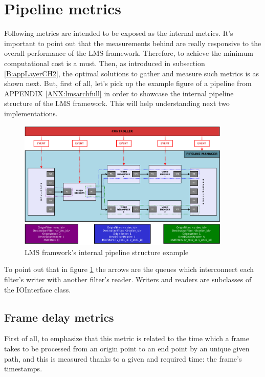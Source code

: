 \section{Pipeline metrics}

Following metrics are intended to be exposed as the internal metrics. It's important to point out that the measurements behind are really responsive to the overall performance of the LMS framework. Therefore, to achieve the minimum computational cost is a must. Then, as introduced in subsection \ref{B:appLayerCH2}, the optimal solutions to gather and measure such metrics is as shown next. But, first of all, let's pick up the example figure of a pipeline from APPENDIX \ref{ANX:lmsarchfull} in order to showcase the internal pipeline structure of the LMS framework. This will help understanding next two implementations.

\begin{figure}[!htb]
\begin{center}
\includegraphics[width=0.9\textwidth]{./images/LMSpipelineBasicOne.png}
\caption{LMS framwork's internal pipeline structure example}
\label{F:lmsps}
\end{center}
\end{figure}

To point out that in figure \ref{F:lmsps} the arrows are the queues which interconnect each filter's writer with another filter's reader. Writers and readers are subclasses of the IOInterface class.

\subsection{Frame delay metrics}

First of all, to emphasize that this metric is related to the time which a frame takes to be processed from an origin point to an end point by an unique given path, and this is measured thanks to a given and required time: the frame's timestamps. 

